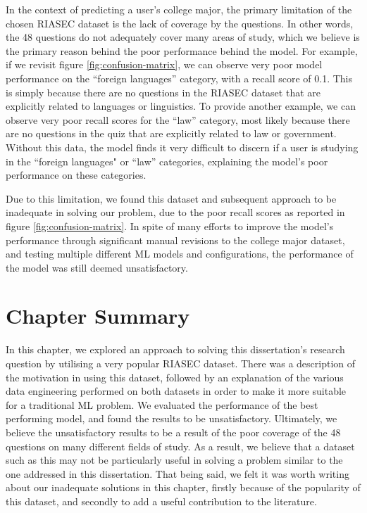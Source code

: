 In the context of predicting a user's college major, the primary limitation of the chosen RIASEC dataset is the lack of coverage by the questions.
In other words, the 48 questions do not adequately cover many areas of study,
which we believe is the primary reason behind the poor performance behind the model.
For example, if we revisit figure \ref{fig:confusion-matrix}, we can observe very poor model performance on the ``foreign languages'' category, with a recall score of 0.1.
This is simply because there are no questions in the RIASEC dataset that are explicitly related to languages or linguistics.
To provide another example, we can observe very poor recall scores for the ``law'' category, most likely because
there are no questions in the quiz that are explicitly related to law or government.
Without this data, the model finds it very difficult to discern if a user is studying in the ``foreign languages" or ``law'' categories, explaining the model's poor performance on these categories.

Due to this limitation, we found this dataset and subsequent approach to be inadequate in solving our problem, due to the poor recall scores as reported in figure \ref{fig:confusion-matrix}.
In spite of many efforts to improve the model's performance through significant manual revisions to the college major dataset,
and testing multiple different ML models and configurations,
the performance of the model was still deemed unsatisfactory.

\section{Chapter Summary}

In this chapter, we explored an approach to solving this dissertation's research question by 
utilising a very popular RIASEC dataset.
There was a description of the motivation in using this dataset, followed by an explanation of the various data engineering 
performed on both datasets in order to make it more suitable for a traditional ML problem.
We evaluated the performance of the best performing model, and found the results to be unsatisfactory.
Ultimately, we believe the unsatisfactory results to be a result of the poor coverage of the 48 questions on many different fields of study.
As a result, we believe that a dataset such as this may not be particularly useful in solving a problem similar to the one addressed in this dissertation.
That being said, we felt it was worth writing about our inadequate solutions in this chapter, 
firstly because of the popularity of this dataset,
and secondly to add a useful contribution to the literature.


